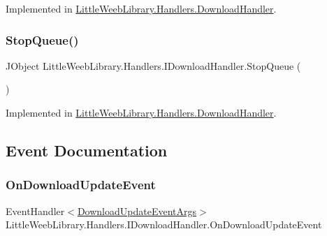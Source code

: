 Implemented in \mbox{\hyperlink{class_little_weeb_library_1_1_handlers_1_1_download_handler_a3d913e57fb5f46a736c02858364609f9}{Little\+Weeb\+Library.\+Handlers.\+Download\+Handler}}.

\mbox{\label{interface_little_weeb_library_1_1_handlers_1_1_i_download_handler_a7cc8a36cbac3bcfb4e9761fae2c5ac53}} 
\subsubsection{\texorpdfstring{Stop\+Queue()}{StopQueue()}}
{\footnotesize\ttfamily J\+Object Little\+Weeb\+Library.\+Handlers.\+I\+Download\+Handler.\+Stop\+Queue (\begin{DoxyParamCaption}{ }\end{DoxyParamCaption})}



Implemented in \mbox{\hyperlink{class_little_weeb_library_1_1_handlers_1_1_download_handler_a8fd807f023ed25e031844da3927e1a23}{Little\+Weeb\+Library.\+Handlers.\+Download\+Handler}}.



\subsection{Event Documentation}
\mbox{\label{interface_little_weeb_library_1_1_handlers_1_1_i_download_handler_ab1d80f17c3714758e3a605adddfe68ef}} 
\subsubsection{\texorpdfstring{On\+Download\+Update\+Event}{OnDownloadUpdateEvent}}
{\footnotesize\ttfamily Event\+Handler$<$\mbox{\hyperlink{class_little_weeb_library_1_1_event_arguments_1_1_download_update_event_args}{Download\+Update\+Event\+Args}}$>$ Little\+Weeb\+Library.\+Handlers.\+I\+Download\+Handler.\+On\+Download\+Update\+Event}



